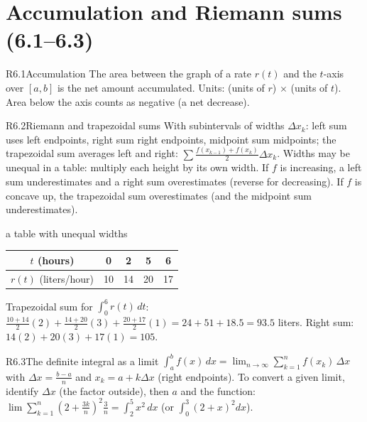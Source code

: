 \documentclass{apcalc}
\begin{document}
\section{Accumulation and Riemann sums (6.1--6.3)}

\begin{rulebox}{R6.1}{Accumulation}
The area between the graph of a rate $r(t)$ and the $t$-axis over $[a,b]$ is the net amount accumulated. Units: (units of $r$) $\times$ (units of $t$). Area below the axis counts as negative (a net decrease).
\end{rulebox}

\begin{rulebox}{R6.2}{Riemann and trapezoidal sums}
With subintervals of widths $\Delta x_k$: left sum uses left endpoints, right sum right endpoints, midpoint sum midpoints; the trapezoidal sum averages left and right: $\sum\frac{f(x_{k-1})+f(x_k)}{2}\Delta x_k$. Widths may be unequal in a table: multiply each height by its own width. If $f$ is increasing, a left sum underestimates and a right sum overestimates (reverse for decreasing). If $f$ is concave up, the trapezoidal sum overestimates (and the midpoint sum underestimates).
\end{rulebox}

\begin{example}{a table with unequal widths}
\begin{center}\small\begin{tabular}{|c|c|c|c|c|}\hline $t$ (hours) & 0 & 2 & 5 & 6\\\hline $r(t)$ (liters/hour) & 10 & 14 & 20 & 17\\\hline\end{tabular}\end{center}
Trapezoidal sum for $\int_0^6 r(t)\,dt$: $\frac{10+14}{2}(2)+\frac{14+20}{2}(3)+\frac{20+17}{2}(1)=24+51+18.5=93.5$ liters. Right sum: $14(2)+20(3)+17(1)=105$. 
\end{example}

\begin{rulebox}{R6.3}{The definite integral as a limit}
$\displaystyle\int_a^b f(x)\,dx=\lim_{n\to\infty}\sum_{k=1}^n f(x_k)\,\Delta x$ with $\Delta x=\frac{b-a}{n}$ and $x_k=a+k\Delta x$ (right endpoints). To convert a given limit, identify $\Delta x$ (the factor outside), then $a$ and the function: $\lim\sum_{k=1}^n\left(2+\frac{3k}{n}\right)^2\frac3n=\int_2^5x^2\,dx$ (or $\int_0^3(2+x)^2dx$).
\end{rulebox}
\end{document}
